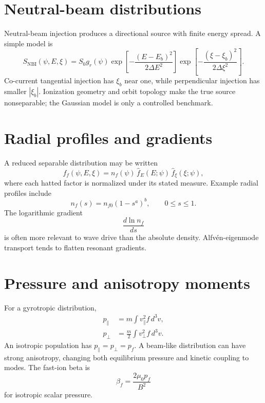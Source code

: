 \documentclass[11pt]{article}
\begin{document}
\section{Neutral-beam distributions}
Neutral-beam injection produces a directional source with finite energy spread. A simple model is
\begin{equation}
S_{\mathrm{NBI}}(\psi,E,\xi)=S_0g_r(\psi)
\exp\!\left[-\frac{(E-E_b)^2}{2\Delta E^2}\right]
\exp\!\left[-\frac{(\xi-\xi_b)^2}{2\Delta\xi^2}\right].
\end{equation}
Co-current tangential injection has $\xi_b$ near one, while perpendicular injection has smaller $|\xi_b|$. Ionization geometry and orbit topology make the true source nonseparable; the Gaussian model is only a controlled benchmark.

\section{Radial profiles and gradients}
A reduced separable distribution may be written
\begin{equation}
f_f(\psi,E,\xi)=n_f(\psi)\,\widehat f_E(E;\psi)
\,\widehat f_\xi(\xi;\psi),
\end{equation}
where each hatted factor is normalized under its stated measure. Example radial profiles include
\begin{equation}
n_f(s)=n_{f0}(1-s^a)^b,
\qquad 0\le s\le1.
\end{equation}
The logarithmic gradient
\begin{equation}
\frac{d\ln n_f}{ds}
\end{equation}
is often more relevant to wave drive than the absolute density. Alfv\'en-eigenmode transport tends to flatten resonant gradients.

\section{Pressure and anisotropy moments}
For a gyrotropic distribution,
\begin{align}
p_\parallel&=m\int v_\parallel^2 f\,d^3v,\\
p_\perp&=\frac{m}{2}\int v_\perp^2 f\,d^3v.
\end{align}
An isotropic population has $p_\parallel=p_\perp=p_f$. A beam-like distribution can have strong anisotropy, changing both equilibrium pressure and kinetic coupling to modes. The fast-ion beta is
\begin{equation}
\beta_f=\frac{2\mu_0p_f}{B^2}
\end{equation}
for isotropic scalar pressure.
\end{document}
